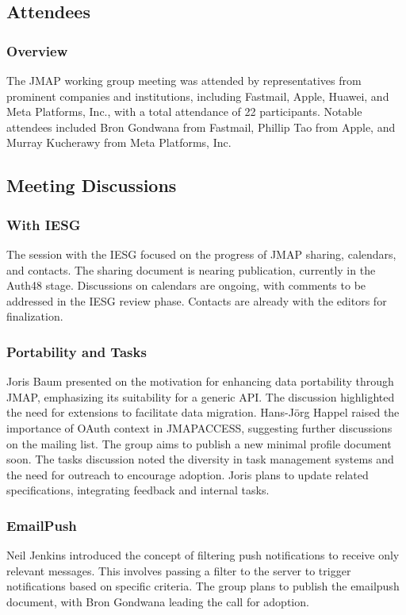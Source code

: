 \documentclass{article}
\begin{document}
\subsection{Attendees}
\subsubsection{Overview}
The JMAP working group meeting was attended by representatives from prominent companies and institutions, including Fastmail, Apple, Huawei, and Meta Platforms, Inc., with a total attendance of 22 participants. Notable attendees included Bron Gondwana from Fastmail, Phillip Tao from Apple, and Murray Kucherawy from Meta Platforms, Inc.

\subsection{Meeting Discussions}

\subsubsection{With IESG}
The session with the IESG focused on the progress of JMAP sharing, calendars, and contacts. The sharing document is nearing publication, currently in the Auth48 stage. Discussions on calendars are ongoing, with comments to be addressed in the IESG review phase. Contacts are already with the editors for finalization.

\subsubsection{Portability and Tasks}
Joris Baum presented on the motivation for enhancing data portability through JMAP, emphasizing its suitability for a generic API. The discussion highlighted the need for extensions to facilitate data migration. Hans-Jörg Happel raised the importance of OAuth context in JMAPACCESS, suggesting further discussions on the mailing list. The group aims to publish a new minimal profile document soon. The tasks discussion noted the diversity in task management systems and the need for outreach to encourage adoption. Joris plans to update related specifications, integrating feedback and internal tasks.

\subsubsection{EmailPush}
Neil Jenkins introduced the concept of filtering push notifications to receive only relevant messages. This involves passing a filter to the server to trigger notifications based on specific criteria. The group plans to publish the emailpush document, with Bron Gondwana leading the call for adoption.
\end{document}
